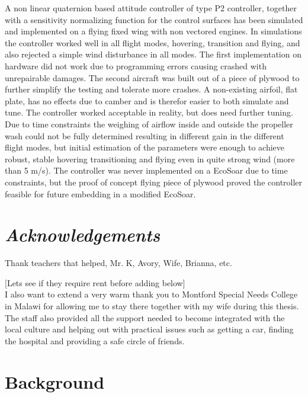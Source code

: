\documentclass{article}
\begin{document}
\abstract
A non linear quaternion based attitude controller of type P2 controller, together with a sensitivity normalizing function for the control surfaces has been simulated and implemented on a flying fixed wing with non vectored engines.
In simulations the controller worked well in all flight modes, hovering, transition and flying, and also rejected a simple wind disturbance in all modes.
The first implementation on hardware did not work due to programming errors causing crashed with unrepairable damages.
The second aircraft was built out of a piece of plywood to further simplify the testing and tolerate more crashes.
A non-existing airfoil, flat plate, has no effects due to camber and is therefor easier to both simulate and tune.
The controller worked acceptable in reality, but does need further tuning.
Due to time constraints the weighing of airflow inside and outside the propeller wash could not be fully determined resulting in different gain in the different flight modes, but initial estimation of the parameters were enough to achieve robust, stable hovering transitioning and flying even in quite strong wind (more than 5 m/s).
The controller was never implemented on a EcoSoar due to time constraints, but the proof of concept flying piece of plywood proved the controller feasible for future embedding in a modified EcoSoar. 


\newpage
\section*{\textit{Acknowledgements}}

Thank teachers that helped, Mr. K, Avory, Wife, Brianna, etc.

[Lets see if they require rent before adding below]\\
I also want to extend a very warm thank you to Montford Special Needs College in Malawi for allowing me to stay there together with my wife during this thesis.
The staff also provided all the support needed to become integrated with the local culture and helping out with practical issues such as getting a car, finding the hospital and providing a safe circle of friends.

\newpage

\tableofcontents

\newpage

\newpage

\section{Background}

\end{document}
